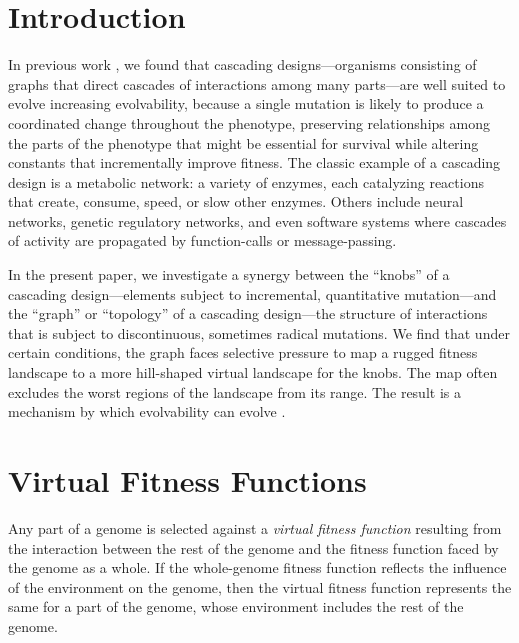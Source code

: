 \documentclass[letterpaper]{article}
\begin{document}
%

\section{Introduction}

In previous work \citep{kovitz2015experiments}, we found that cascading
designs---organisms consisting of graphs that direct cascades of interactions
among many parts---are well suited to evolve increasing evolvability, because
a single mutation is likely to produce a coordinated change throughout the
phenotype, preserving relationships among the parts of the phenotype that might
be essential for survival while altering constants that incrementally improve
fitness. The classic example of a cascading design is a metabolic network: a
variety of enzymes, each catalyzing reactions that create, consume, speed, or
slow other enzymes. Others include neural networks, genetic regulatory
networks, and even software systems where cascades of activity are propagated
by function-calls or message-passing.

In the present paper, we investigate a synergy between the ``knobs'' of a
cascading design---elements subject to incremental, quantitative
mutation---and the ``graph'' or ``topology'' of a cascading design---the
structure of interactions that is subject to discontinuous, sometimes radical
mutations.  We find that under certain conditions, the graph faces selective
pressure to map a rugged fitness landscape to a more hill-shaped virtual
landscape for the knobs. The map often excludes the worst regions of the
landscape from its range. The result is a mechanism by which evolvability can
evolve \citep{colegrave2008experimental}.

\section{Virtual Fitness Functions}

Any part of a genome is selected against a \textit{virtual fitness function}
resulting from the interaction between the rest of the genome and the fitness
function faced by the genome as a whole. If the whole-genome fitness function
reflects the influence of the environment on the genome, then the virtual
fitness function represents the same for a part of the genome, whose
environment includes the rest of the genome.
\end{document}
